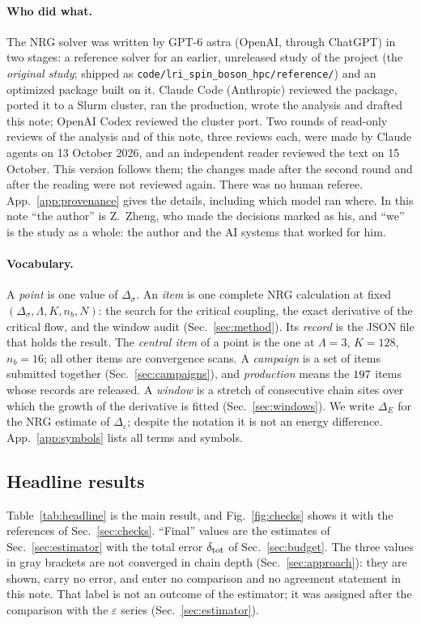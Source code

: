 \documentclass[10pt,a4paper]{article}
\newcommand{\Ds}{\Delta_\sigma}
\newcommand{\De}{\Delta_\varepsilon}
\newcommand{\DE}{\Delta_E}
\newcommand{\code}[1]{\texttt{#1}}
\newcommand{\dtot}{\delta_{\rm tot}}
\begin{document}
\paragraph{Who did what.} The NRG solver was written by GPT-6 astra (OpenAI, through ChatGPT) in two stages: a reference solver for
an earlier, unreleased study of the project (the \emph{original study}; shipped as \code{code/lri\_spin\_boson\_hpc/reference/}) and
an optimized package built on it. Claude Code (Anthropic) reviewed the package, ported it to a Slurm cluster, ran the production,
wrote the analysis and drafted this note; OpenAI Codex reviewed the cluster port. Two rounds of read-only reviews of the analysis
and of this note, three reviews each, were made by Claude agents on 13 October 2026, and an independent reader reviewed the text on
15 October. This version follows them; the changes made after the second round and after the reading were not reviewed again.
There was no human referee. App.~\ref{app:provenance} gives the details, including which model ran where. In this note ``the
author'' is Z.~Zheng, who made the decisions marked as his, and ``we'' is the study as a whole: the author and the AI systems that
worked for him.

\paragraph{Vocabulary.} A \emph{point} is one value of $\Ds$. An \emph{item} is one complete NRG calculation at fixed
$(\Ds,\Lambda,K,n_b,N)$: the search for the critical coupling, the exact derivative of the critical flow, and the window audit
(Sec.~\ref{sec:method}). Its \emph{record} is the JSON file that holds the result. The \emph{central item} of a point is the one at
$\Lambda=3$, $K=128$, $n_b=16$; all other items are convergence scans. A \emph{campaign} is a set of items submitted together
(Sec.~\ref{sec:campaigns}), and \emph{production} means the $197$ items whose records are released. A \emph{window} is a
stretch of consecutive chain sites over which the growth of the derivative is fitted (Sec.~\ref{sec:windows}). We write $\DE$ for the
NRG estimate of $\De$; despite the notation it is not an energy difference. App.~\ref{app:symbols} lists all terms and symbols.

\subsection{Headline results}
Table~\ref{tab:headline} is the main result, and Fig.~\ref{fig:checks} shows it with the references of Sec.~\ref{sec:checks}.
``Final'' values are the estimates of Sec.~\ref{sec:estimator} with the total error $\dtot$ of Sec.~\ref{sec:budget}. The three values
in gray brackets are not converged in chain depth (Sec.~\ref{sec:approach}): they are shown, carry no error, and enter no comparison
and no agreement statement in this note. That label is not an outcome of the estimator; it was assigned after the comparison with
the $\varepsilon$ series (Sec.~\ref{sec:estimator}).
\end{document}
